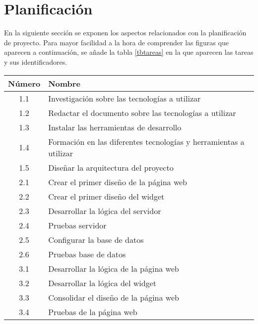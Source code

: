 \section{Planificación}
En la siguiente sección se exponen los aspectos relacionados con la planificación de proyecto. Para mayor facilidad a la hora de comprender las figuras que aparecen a continuación, se añade la tabla \ref{tbtareas} en la que aparecen las tareas y sus identificadores.
\begin{table}[]
	\centering
	\begin{tabular}{|c|l|}
		\hline
		Número & Nombre                                                            \\ \hline
		1.1    & Investigación sobre las tecnologías a utilizar                    \\ \hline
		1.2    & Redactar el documento sobre las tecnologías a utilizar            \\ \hline
		1.3    & Instalar las herramientas de desarrollo                           \\ \hline
		1.4    & Formación en las diferentes tecnologías y herramientas a utilizar \\ \hline
		1.5    & Diseñar la arquitectura del proyecto                              \\ \hline
		2.1    & Crear el primer diseño de la página web                           \\ \hline
		2.2    & Crear el primer diseño del widget                                 \\ \hline
		2.3    & Desarrollar la lógica del servidor                                \\ \hline
		2.4    & Pruebas servidor                                                  \\ \hline
		2.5    & Configurar la base de datos                                       \\ \hline
		2.6    & Pruebas base de datos                                             \\ \hline
		3.1    & Desarrollar la lógica de la página web                            \\ \hline
		3.2    & Desarrollar la lógica del widget                                  \\ \hline
		3.3    & Consolidar el diseño de la página web                             \\ \hline
		3.4    & Pruebas de la página web                                          \\ \hline

\end{tabular}
\end{table}
